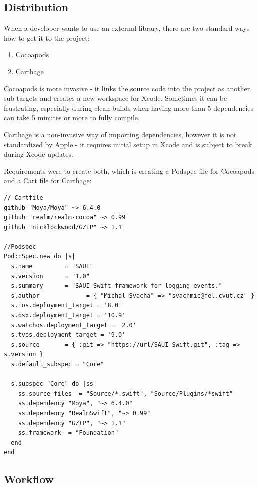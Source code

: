 \subsection{Distribution}

When a developer wants to use an external library, there are two standard ways how to get it to the project:

\begin{enumerate}
	\item Cocoapods
	\item Carthage
\end{enumerate}

Cocoapods is more invasive - it links the source code into the project as another sub-targets and creates a new workspace for Xcode. Sometimes it can be frustrating, especially during clean builds when having more than 5 dependencies can take 5 minutes or more to fully compile.

Carthage is a non-invasive way of importing dependencies, however it is not standardized by Apple - it requires initial setup in Xcode and is subject to break during Xcode updates.

\bigbreak

Requirements were to create both, which is creating a Podspec file for Cocoapods and a Cart file for Carthage:

\begin{lstlisting}
// Cartfile
github "Moya/Moya" ~> 6.4.0
github "realm/realm-cocoa" ~> 0.99
github "nicklockwood/GZIP" ~> 1.1

//Podspec
Pod::Spec.new do |s|
  s.name         = "SAUI"
  s.version      = "1.0"
  s.summary      = "SAUI Swift framework for logging events."
  s.author             = { "Michal Svacha" => "svachmic@fel.cvut.cz" }
  s.ios.deployment_target = '8.0'
  s.osx.deployment_target = '10.9'
  s.watchos.deployment_target = '2.0'
  s.tvos.deployment_target = '9.0'
  s.source       = { :git => "https://url/SAUI-Swift.git", :tag => s.version }
  s.default_subspec = "Core"

  s.subspec "Core" do |ss|
    ss.source_files  = "Source/*.swift", "Source/Plugins/*swift"
    ss.dependency "Moya", "~> 6.4.0"
    ss.dependency "RealmSwift", "~> 0.99"
    ss.dependency "GZIP", "~> 1.1"
    ss.framework  = "Foundation"
  end
end

\end{lstlisting}	

\newpage

\subsection{Workflow}


